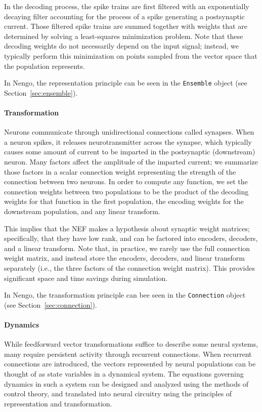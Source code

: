 \documentclass{frontiersSCNS}
\begin{document}
In the decoding process,
the spike trains are first filtered
with an exponentially decaying filter
accounting for the process
of a spike generating a postsynaptic current.
Those filtered spike trains are summed together
with weights that are determined
by solving a least-squares minimization problem.
Note that these decoding weights
do not necessarily depend on the input signal;
instead, we typically perform
this minimization on points
sampled from
the vector space
that the population represents.

In Nengo, the representation principle
can be seen in the \texttt{Ensemble}
object (see Section~\ref{sec:ensemble}).

\paragraph{Transformation}
Neurons communicate through
unidirectional connections called synapses.
When a neuron spikes,
it releases neurotransmitter across the synapse,
which typically causes some amount of current
to be imparted in the postsynaptic (downstream) neuron.
Many factors affect the
amplitude of the imparted current;
we summarize those factors
in a scalar connection weight
representing the strength
of the connection between two neurons.
In order to compute any function,
we set the connection weights between
two populations to be the product of
the decoding weights for that function
in the first population,
the encoding weights
for the downstream population,
and any linear transform.

This implies that the NEF makes
a hypothesis about synaptic weight matrices;
specifically, that they
have low rank, and can be factored
into encoders, decoders, and a linear transform.
Note that, in practice, we rarely use
the full connection weight matrix,
and instead store
the encoders, decoders, and linear transform separately
(i.e., the three factors of the connection weight matrix).
This provides significant
space and time savings during simulation.

In Nengo, the transformation principle
can bee seen in the \texttt{Connection}
object (see Section~\ref{sec:connection}).

\paragraph{Dynamics}
While feedforward vector transformations
suffice to describe
some neural systems,
many require persistent activity through recurrent connections.
When recurrent connections are introduced,
the vectors represented by neural populations
can be thought of as state variables
in a dynamical system.
The equations governing dynamics
in such a system
can be designed and analyzed
using the methods of control theory,
and translated into neural circuitry
using the principles
of representation and transformation.
\end{document}
